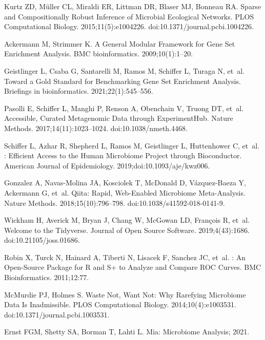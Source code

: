 \documentclass[10pt,letterpaper]{article}
\begin{document}
\begin{thebibliography}{10}
Kurtz ZD, M{\"u}ller CL, Miraldi ER, Littman DR, Blaser MJ, Bonneau RA.
\newblock Sparse and {{Compositionally Robust Inference}} of {{Microbial
  Ecological Networks}}.
\newblock PLOS Computational Biology. 2015;11(5):e1004226.
\newblock doi:{10.1371/journal.pcbi.1004226}.

Ackermann M, Strimmer K.
\newblock A General Modular Framework for Gene Set Enrichment Analysis.
\newblock BMC bioinformatics. 2009;10(1):1--20.

Geistlinger L, Csaba G, Santarelli M, Ramos M, Schiffer L, Turaga N, et~al.
\newblock Toward a Gold Standard for Benchmarking Gene Set Enrichment Analysis.
\newblock Briefings in bioinformatics. 2021;22(1):545--556.

Pasolli E, Schiffer L, Manghi P, Renson A, Obenchain V, Truong DT, et~al.
\newblock Accessible, Curated Metagenomic Data through {{ExperimentHub}}.
\newblock Nature Methods. 2017;14(11):1023--1024.
\newblock doi:{10.1038/nmeth.4468}.

Schiffer L, Azhar R, Shepherd L, Ramos M, Geistlinger L, Huttenhower C, et~al.
: {{Efficient}} Access to the Human Microbiome Project
  through Bioconductor.
\newblock American Journal of Epidemiology. 2019;doi:{10.1093/aje/kwz006}.

Gonzalez A, {Navas-Molina} JA, Kosciolek T, McDonald D, {V{\'a}zquez-Baeza} Y,
  Ackermann G, et~al.
\newblock Qiita: Rapid, Web-Enabled Microbiome Meta-Analysis.
\newblock Nature Methods. 2018;15(10):796--798.
\newblock doi:{10.1038/s41592-018-0141-9}.

Wickham H, Averick M, Bryan J, Chang W, McGowan LD, Fran{\c c}ois R, et~al.
\newblock Welcome to the Tidyverse.
\newblock Journal of Open Source Software. 2019;4(43):1686.
\newblock doi:{10.21105/joss.01686}.

Robin X, Turck N, Hainard A, Tiberti N, Lisacek F, Sanchez JC, et~al.
: An Open-Source Package for {{R}} and {{S}}+ to Analyze and
  Compare {{ROC}} Curves.
\newblock BMC Bioinformatics. 2011;12:77.

McMurdie PJ, Holmes S.
\newblock Waste {{Not}}, {{Want Not}}: {{Why Rarefying Microbiome Data Is
  Inadmissible}}.
\newblock PLOS Computational Biology. 2014;10(4):e1003531.
\newblock doi:{10.1371/journal.pcbi.1003531}.

Ernst FGM, Shetty SA, Borman T, Lahti L. Mia: {{Microbiome}} Analysis; 2021.


\end{thebibliography}
\end{document}
